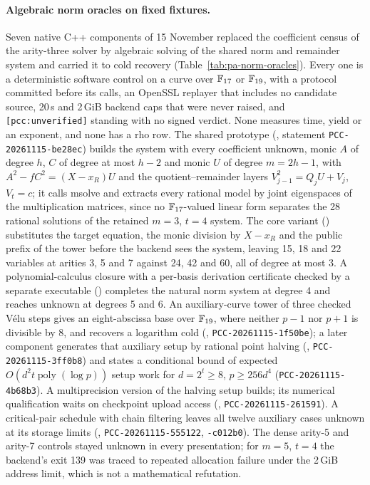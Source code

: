 \paragraph{Algebraic norm oracles on fixed fixtures.} Seven native C++
components of 15 November replaced the coefficient census of the arity-three
solver by algebraic solving of the shared norm and remainder system and
carried it to cold recovery (Table~\ref{tab:pa-norm-oracles}). Every one is a
deterministic software control on a curve over $\mathbb{F}_{17}$ or $\mathbb{F}_{19}$,
with a protocol committed before its calls, an OpenSSL replayer that
includes no candidate source, 20\,s and 2\,GiB backend caps that were never
raised, and \texttt{[pcc:unverified]} standing with no signed verdict. None
measures time, yield or an exponent, and none has a rho row. The shared
prototype (, statement
\texttt{PCC-20261115-be28ec}) builds the system with every coefficient
unknown, monic $A$ of degree $h$, $C$ of degree at most $h-2$ and monic $U$ of
degree $m=2h-1$, with $A^2-fC^2=(X-x_R)U$ and the quotient--remainder layers
$V_{j-1}^2=Q_jU+V_j$, $V_t=c$; it calls msolve and extracts every rational
model by joint eigenspaces of the multiplication matrices, since no
$\mathbb{F}_{17}$-valued linear form separates the 28 rational solutions of the
retained $m=3$, $t=4$ system. The core variant
() substitutes the
target equation, the monic division by $X-x_R$ and the public prefix of the
tower before the backend sees the system, leaving 15, 18 and 22 variables at
arities 3, 5 and 7 against 24, 42 and 60, all of degree at most 3. A
polynomial-calculus closure with a per-basis derivation certificate checked
by a separate executable ()
completes the natural norm system at degree 4 and reaches unknown at
degrees 5 and 6. An auxiliary-curve tower of three checked V\'elu steps
gives an eight-abscissa base over $\mathbb{F}_{19}$, where neither $p-1$ nor $p+1$
is divisible by 8, and recovers a logarithm cold
(,
\texttt{PCC-20261115-1f50be}); a later component generates that auxiliary
setup by rational point halving
(,
\texttt{PCC-20261115-3ff0b8}) and states a conditional bound of expected
$O(d^2t\operatorname{poly}(\log p))$ setup work for $d=2^t\ge8$,
$p\ge256d^4$ (\texttt{PCC-20261115-4b68b3}). A multiprecision version of the
halving setup builds; its numerical qualification waits on checkpoint upload
access (,
\texttt{PCC-20261115-261591}). A critical-pair schedule with chain filtering
leaves all twelve auxiliary cases unknown at its storage limits
(,
\texttt{PCC-20261115-555122}, \texttt{-c012b0}). The dense arity-5 and
arity-7 controls stayed unknown in every presentation; for $m=5$, $t=4$ the
backend's exit 139 was traced to repeated allocation failure under the
2\,GiB address limit, which is not a mathematical refutation.

